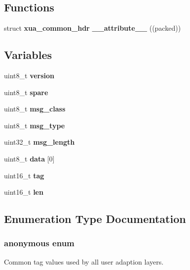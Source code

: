 \subsection*{Functions}
\begin{DoxyCompactItemize}
\item 
struct {\bf xua\+\_\+common\+\_\+hdr} {\bf \+\_\+\+\_\+attribute\+\_\+\+\_\+} ((packed))
\end{DoxyCompactItemize}
\subsection*{Variables}
\begin{DoxyCompactItemize}
\item 
uint8\+\_\+t {\bf version}
\item 
uint8\+\_\+t {\bf spare}
\item 
uint8\+\_\+t {\bf msg\+\_\+class}
\item 
uint8\+\_\+t {\bf msg\+\_\+type}
\item 
uint32\+\_\+t {\bf msg\+\_\+length}
\item 
uint8\+\_\+t {\bf data} [0]
\item 
uint16\+\_\+t {\bf tag}
\item 
uint16\+\_\+t {\bf len}
\end{DoxyCompactItemize}


\subsection{Enumeration Type Documentation}
\subsubsection[{anonymous enum}]{\setlength{\rightskip}{0pt plus 5cm}anonymous enum}\label{xua__types_8h_a4790f45dcc812c1b00184a2edccdddf5}


Common tag values used by all user adaption layers. 


